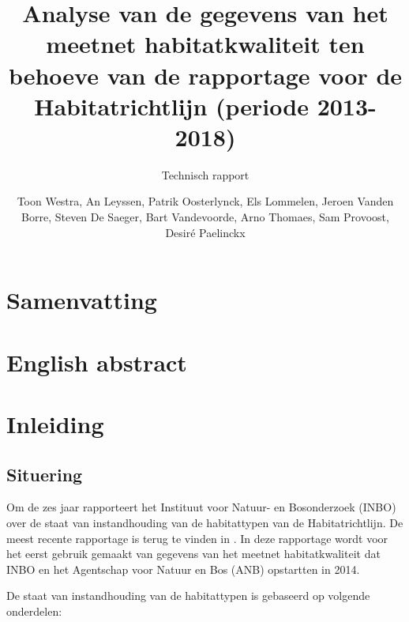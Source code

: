 \documentclass[twoside]{extreport}
\title{Analyse van de gegevens van het meetnet habitatkwaliteit ten behoeve van
de rapportage voor de Habitatrichtlijn (periode 2013-2018)}
\subtitle{Technisch rapport}
\author{Toon Westra, An Leyssen, Patrik Oosterlynck, Els Lommelen, Jeroen Vanden
Borre, Steven De Saeger, Bart Vandevoorde, Arno Thomaes, Sam Provoost,
Desiré Paelinckx}
\begin{document}
\maketitle
{}



\clearpage

\setcounter{tocdepth}{3}
\tableofcontents
{}

\clearpage

\listoffigures
{}
\vspace{34pt}

\listoftables
{}

\clearpage


\chapter*{Samenvatting}\label{samenvatting}

\chapter*{English abstract}\label{english-abstract}

\benglish

\eenglish

\chapter{Inleiding}\label{inleiding}

\section{Situering}\label{situering}

Om de zes jaar rapporteert het Instituut voor Natuur- en Bosonderzoek
(INBO) over de staat van instandhouding van de habitattypen van de
Habitatrichtlijn. De meest recente rapportage is terug te vinden in
\citet{Paelinckx2019}. In deze rapportage wordt voor het eerst gebruik
gemaakt van gegevens van het meetnet habitatkwaliteit \citep{Westra2014}
dat INBO en het Agentschap voor Natuur en Bos (ANB) opstartten in 2014.

De staat van instandhouding van de habitattypen is gebaseerd op volgende
onderdelen:
\end{document}
